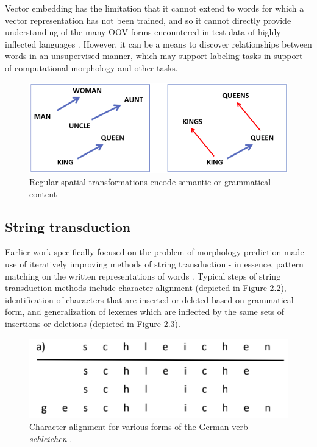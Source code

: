 Vector embedding has the limitation that it cannot extend to words for which a vector representation has not been trained, and so it cannot directly provide understanding of the many OOV forms encountered in test data of highly inflected languages \parencite{Soricut2015} \parencite{Cotterell2019}. However, it can be a means to discover relationships between words in an unsupervised manner, which may support labeling tasks in support of computational morphology and other tasks.

\begin{figure}[t]
\includegraphics[width=12cm]{images/semantic_transform.png}
\centering
\caption{Regular spatial transformations encode semantic or grammatical content \parencite{Mikolov2013}}
\end{figure}

\subsection{String transduction}

Earlier work specifically focused on the problem of morphology prediction made use of iteratively improving methods of string transduction - in essence, pattern matching on the written representations of words \parencite{Durrett2013} \parencite{Hulden2014} \parencite{Nicolai2015} \parencite{Ahlberg2015}. Typical steps of string transduction methods include character alignment (depicted in Figure 2.2), identification of characters that are inserted or deleted based on grammatical form, and generalization of lexemes which are inflected by the same sets of insertions or deletions (depicted in Figure 2.3). 

\begin{figure}[t]
\includegraphics[width=12cm]{images/Nicolai2015_schleichen.png}
\centering
\caption{Character alignment for various forms of the German verb \textit{schleichen} \parencite{Nicolai2015}.}
\end{figure}

